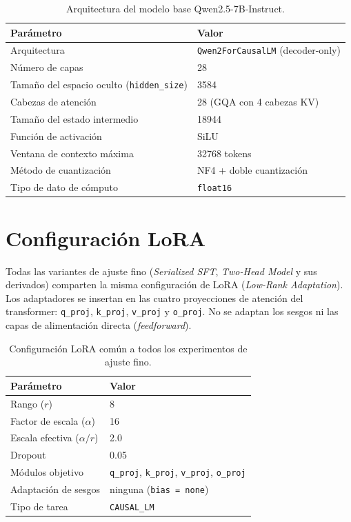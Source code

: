 \begin{table}[htbp]
\centering
\caption{Arquitectura del modelo base Qwen2.5-7B-Instruct.}
\label{tab:AnexoA_model}
\begin{tabular}{ll}
\toprule
\textbf{Parámetro} & \textbf{Valor} \\
\midrule
Arquitectura & \texttt{Qwen2ForCausalLM} (decoder-only) \\
Número de capas & 28 \\
Tamaño del espacio oculto (\texttt{hidden\_size}) & 3584 \\
Cabezas de atención & 28 (GQA con 4 cabezas KV) \\
Tamaño del estado intermedio & 18944 \\
Función de activación & SiLU \\
Ventana de contexto máxima & 32768 tokens \\
Método de cuantización & NF4 + doble cuantización \\
Tipo de dato de cómputo & \texttt{float16} \\
\bottomrule
\end{tabular}
\end{table}

\section{Configuración LoRA}

Todas las variantes de ajuste fino (\textit{Serialized SFT}, \textit{Two-Head Model} y sus derivados) comparten la misma configuración de LoRA (\textit{Low-Rank Adaptation}).
Los adaptadores se insertan en las cuatro proyecciones de atención del transformer: \texttt{q\_proj}, \texttt{k\_proj}, \texttt{v\_proj} y \texttt{o\_proj}. No se adaptan los sesgos
ni las capas de alimentación directa (\textit{feedforward}).

\begin{table}[htbp]
\centering
\caption{Configuración LoRA común a todos los experimentos de ajuste fino.}
\label{tab:AnexoA_lora}
\begin{tabular}{ll}
\toprule
\textbf{Parámetro} & \textbf{Valor} \\
\midrule
Rango ($r$) & 8 \\
Factor de escala ($\alpha$) & 16 \\
Escala efectiva ($\alpha / r$) & 2.0 \\
Dropout & 0.05 \\
Módulos objetivo & \texttt{q\_proj}, \texttt{k\_proj}, \texttt{v\_proj}, \texttt{o\_proj} \\
Adaptación de sesgos & ninguna (\texttt{bias = none}) \\
Tipo de tarea & \texttt{CAUSAL\_LM} \\
\bottomrule
\end{tabular}
\end{table}

